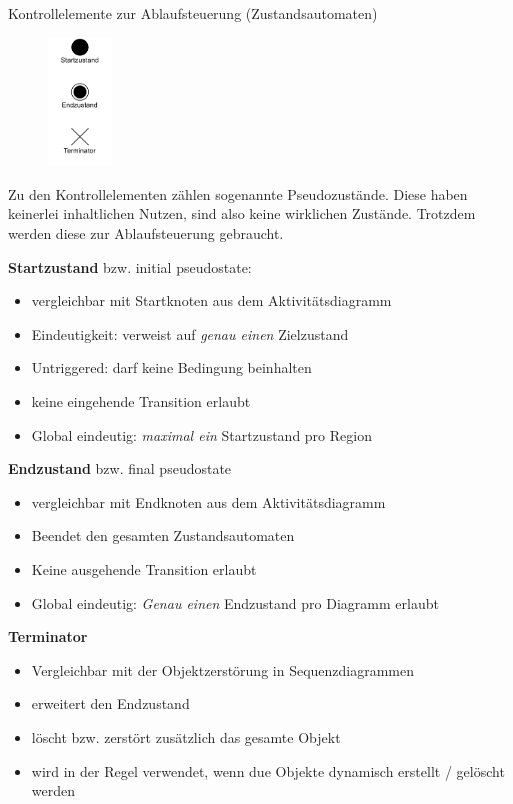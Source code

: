 \begin{defi}{Kontrollelemente zur Ablaufsteuerung (Zustandsautomaten)}
    \begin{figure}
        \centering
        \includegraphics[width=0.15\textwidth]{includes/figures/defi_diagrams_state_start.pdf}
    \end{figure}
    Zu den Kontrollelementen zählen sogenannte Pseudozustände.
    Diese haben keinerlei inhaltlichen Nutzen, sind also keine wirklichen Zustände.
    Trotzdem werden diese zur Ablaufsteuerung gebraucht.

    \textbf{Startzustand} bzw. initial pseudostate:
    \begin{itemize}
        \item vergleichbar mit Startknoten aus dem Aktivitätsdiagramm
        \item Eindeutigkeit: verweist auf \emph{genau einen} Zielzustand
        \item Untriggered: darf keine Bedingung beinhalten
        \item keine eingehende Transition erlaubt
        \item Global eindeutig: \emph{maximal ein} Startzustand pro Region
    \end{itemize}

    \textbf{Endzustand} bzw. final pseudostate
    \begin{itemize}
        \item vergleichbar mit Endknoten aus dem Aktivitätsdiagramm
        \item Beendet den gesamten Zustandsautomaten
        \item Keine ausgehende Transition erlaubt
        \item Global eindeutig: \emph{Genau einen} Endzustand pro Diagramm erlaubt
    \end{itemize}

    \textbf{Terminator}
    \begin{itemize}
        \item Vergleichbar mit der Objektzerstörung in Sequenzdiagrammen
        \item erweitert den Endzustand
        \item löscht bzw. zerstört zusätzlich das gesamte Objekt
        \item wird in der Regel verwendet, wenn due Objekte dynamisch erstellt / gelöscht werden
    \end{itemize}
\end{defi}

